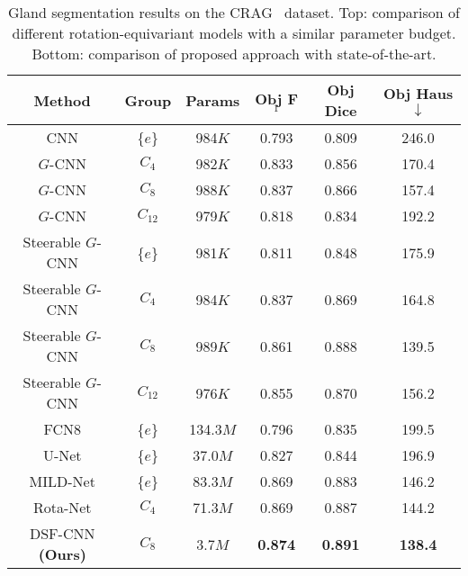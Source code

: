 \documentclass[journal]{IEEEtran}
\begin{document}
	
\begin{table}[h]
		\begin{center}
			\caption{Gland segmentation results on the CRAG~\cite{graham2019mild} dataset. Top: comparison of different rotation-equivariant models with a similar parameter budget. Bottom: comparison of proposed approach with state-of-the-art.}
			\label{dup2 table:comparative_crag}
			\setlength{\tabcolsep}{2pt} \renewcommand{\arraystretch}{1} \begin{tabular}{c|c|c|c|c|c}
 					     \textbf{Method}
						 & \textbf{Group} & \textbf{Params}
						 & \textbf{Obj F$_1$} & \textbf{Obj Dice} & \textbf{Obj Haus $\downarrow$} \\
					\midrule
					
					
CNN  & \{$e$\} & 984$K$ & 0.793 &    0.809 & 246.0 \\ 
					$G$-CNN \cite{cohen2016group} & $C_4$ & 982$K$ & 0.833 & 0.856 & 170.4  \\ 
					$G$-CNN \cite{bekkers2018roto,lafarge2020roto} & $C_{8}$ & 988$K$ &  0.837 & 0.866 & 157.4 \\ 
					$G$-CNN \cite{bekkers2018roto,lafarge2020roto} & $C_{12}$ & 979$K$ &  0.818 & 0.834 & 192.2 \\ 
					Steerable $G$-CNN \cite{weiler2018learning} & \{$e$\} & 981$K$ & 0.811 & 0.848 & 175.9 \\
					Steerable $G$-CNN \cite{weiler2018learning} & $C_{4}$ & 984$K$ & 0.837 & 0.869 & 164.8 \\ 
					Steerable $G$-CNN \cite{weiler2018learning} & $C_{8}$ & 989$K$ & 0.861 & 0.888 & 139.5 \\ 
					Steerable $G$-CNN \cite{weiler2018learning} & $C_{12}$ & 976$K$ & 0.855 & 0.870 & 156.2 \\
					\midrule
					FCN8 \cite{ronneberger2015u} & \{$e$\} & 134.3$M$ &  0.796 & 0.835 & 199.5 \\
					U-Net \cite{ronneberger2015u} & \{$e$\} & 37.0$M$ & 0.827 & 0.844 & 196.9 \\ 
					MILD-Net \cite{graham2019mild} & \{$e$\} & 83.3$M$ & 0.869 & 0.883 & 146.2 \\ 
					Rota-Net \cite{graham2019rota} & $C_{4}$ & 71.3$M$ & 0.869 & 0.887 & 144.2  \\
					DSF-CNN \textbf{(Ours)} & $C_8$ & 3.7$M$ & \textbf{0.874} &  \textbf{0.891} & \textbf{138.4} \\ 
					\bottomrule
				\end{tabular}
		
		\end{center}
	\end{table}
\end{document}
